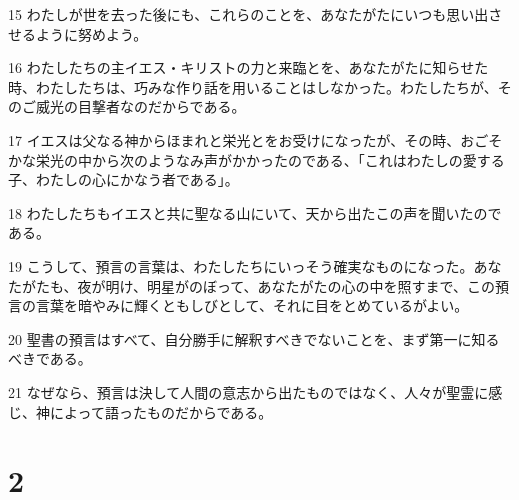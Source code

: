 \par 15 わたしが世を去った後にも、これらのことを、あなたがたにいつも思い出させるように努めよう。
\par 16 わたしたちの主イエス・キリストの力と来臨とを、あなたがたに知らせた時、わたしたちは、巧みな作り話を用いることはしなかった。わたしたちが、そのご威光の目撃者なのだからである。
\par 17 イエスは父なる神からほまれと栄光とをお受けになったが、その時、おごそかな栄光の中から次のようなみ声がかかったのである、「これはわたしの愛する子、わたしの心にかなう者である」。
\par 18 わたしたちもイエスと共に聖なる山にいて、天から出たこの声を聞いたのである。
\par 19 こうして、預言の言葉は、わたしたちにいっそう確実なものになった。あなたがたも、夜が明け、明星がのぼって、あなたがたの心の中を照すまで、この預言の言葉を暗やみに輝くともしびとして、それに目をとめているがよい。
\par 20 聖書の預言はすべて、自分勝手に解釈すべきでないことを、まず第一に知るべきである。
\par 21 なぜなら、預言は決して人間の意志から出たものではなく、人々が聖霊に感じ、神によって語ったものだからである。

\chapter{2}

